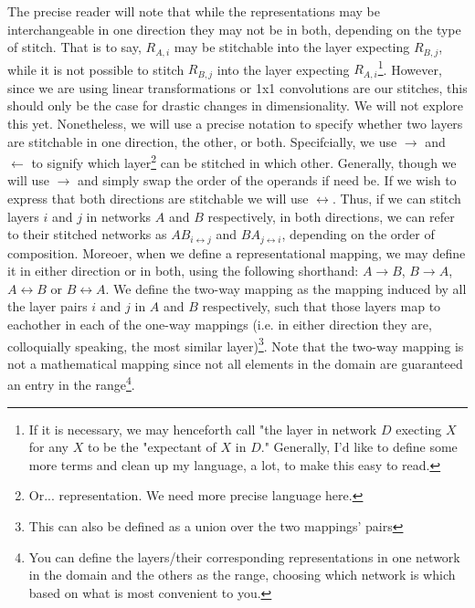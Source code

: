 \documentclass{article} %
\begin{document}
The precise reader will note that while the representations may be interchangeable in one direction they may not be in both, depending on the type of stitch. That is to say, \(R_{A,i}\) may be stitchable into the layer expecting \(R_{B, j}\), while 
it is not possible to stitch \(R_{B,j}\) into the layer expecting \(R_{A,i}\)\footnote{If it is necessary, we may henceforth call "the layer in network \(D\) execting \(X\) for any \(X\) to be the "expectant of \(X\) in \(D\)." Generally, I'd like to define some more terms and clean up my language, a lot, to make this easy to read.}.
However, since we are using linear transformations or 1x1 convolutions are our stitches, this should only be the case for drastic changes in dimensionality. We will not explore this yet. Nonetheless, we will use a precise notation to specify whether two layers
are stitchable in one direction, the other, or both. Specifcially, we use \(\rightarrow\) and \(\leftarrow\) to signify which layer\footnote{Or... representation. We need more precise language here.} can be stitched in which other. Generally, though
we will use \(\rightarrow\) and simply swap the order of the operands if need be. If we wish to express that both directions are stitchable we will use \(\leftrightarrow\). Thus, if we can stitch layers \(i\) and \(j\) in networks \(A\) and \(B\) respectively,
in both directions, we can refer to their stitched networks as \(AB_{i \leftrightarrow j}\) and \(BA_{j \leftrightarrow i}\), depending on the order of composition. Moreoer, when we define a representational mapping, we may define it in either direction or in both,
using the following shorthand: \(A \rightarrow B\), \(B \rightarrow A\), \(A \leftrightarrow B\) or \(B \leftrightarrow A\). We define the two-way mapping as the mapping induced by all the layer pairs \(i\) and \(j\) in \(A\) and \(B\) respectively, such that those
layers map to eachother in each of the one-way mappings (i.e. in either direction they are, colloquially speaking, the most similar layer)\footnote{This can also be defined as a union over the two mappings' pairs}. Note that the two-way mapping is not a mathematical
mapping since not all elements in the domain are guaranteed an entry in the range\footnote{You can define the layers/their corresponding representations in one network in the domain and the others as the range, choosing which network is which based on what is most convenient to you.}.
\end{document}
